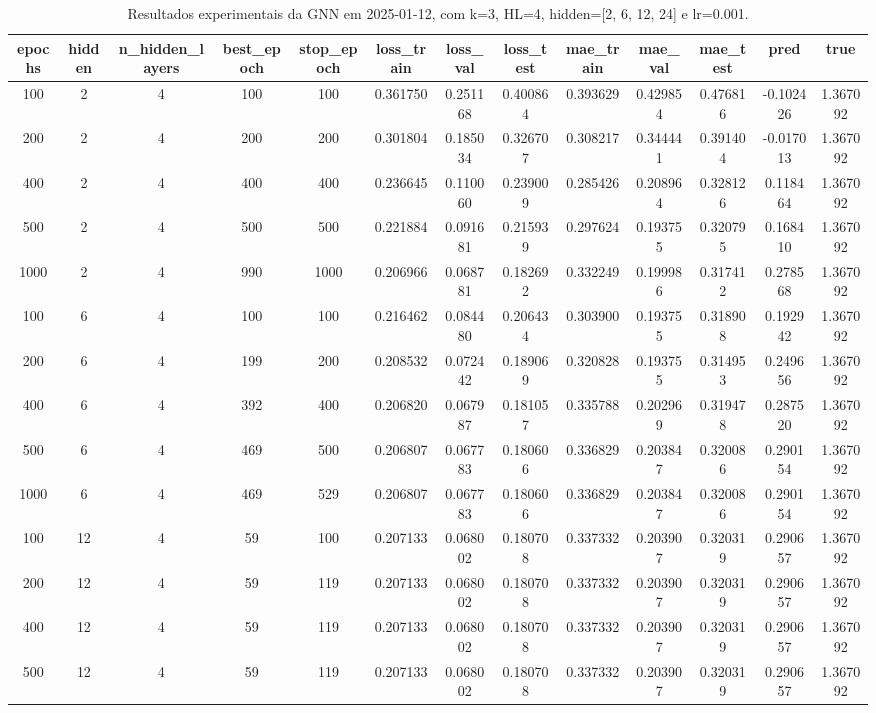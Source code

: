 \begin{table}[h]
\centering
\caption{Resultados experimentais da GNN em 2025-01-12, com k=3, HL=4, hidden=[2, 6, 12, 24] e lr=0.001.}
\label{tab:gnn_results_k3_hl4_d20250112}
\begin{tabular}{ccccccccccccc}
\toprule
epochs & hidden & n\_hidden\_layers & best\_epoch & stop\_epoch & loss\_train & loss\_val & loss\_test & mae\_train & mae\_val & mae\_test & pred & true \\
\midrule
100 & 2 & 4 & 100 & 100 & 0.361750 & 0.251168 & 0.400864 & 0.393629 & 0.429854 & 0.476816 & -0.102426 & 1.367092 \\
200 & 2 & 4 & 200 & 200 & 0.301804 & 0.185034 & 0.326707 & 0.308217 & 0.344441 & 0.391404 & -0.017013 & 1.367092 \\
400 & 2 & 4 & 400 & 400 & 0.236645 & 0.110060 & 0.239009 & 0.285426 & 0.208964 & 0.328126 & 0.118464 & 1.367092 \\
500 & 2 & 4 & 500 & 500 & 0.221884 & 0.091681 & 0.215939 & 0.297624 & 0.193755 & 0.320795 & 0.168410 & 1.367092 \\
1000 & 2 & 4 & 990 & 1000 & 0.206966 & 0.068781 & 0.182692 & 0.332249 & 0.199986 & 0.317412 & 0.278568 & 1.367092 \\
100 & 6 & 4 & 100 & 100 & 0.216462 & 0.084480 & 0.206434 & 0.303900 & 0.193755 & 0.318908 & 0.192942 & 1.367092 \\
200 & 6 & 4 & 199 & 200 & 0.208532 & 0.072442 & 0.189069 & 0.320828 & 0.193755 & 0.314953 & 0.249656 & 1.367092 \\
400 & 6 & 4 & 392 & 400 & 0.206820 & 0.067987 & 0.181057 & 0.335788 & 0.202969 & 0.319478 & 0.287520 & 1.367092 \\
500 & 6 & 4 & 469 & 500 & 0.206807 & 0.067783 & 0.180606 & 0.336829 & 0.203847 & 0.320086 & 0.290154 & 1.367092 \\
1000 & 6 & 4 & 469 & 529 & 0.206807 & 0.067783 & 0.180606 & 0.336829 & 0.203847 & 0.320086 & 0.290154 & 1.367092 \\
100 & 12 & 4 & 59 & 100 & 0.207133 & 0.068002 & 0.180708 & 0.337332 & 0.203907 & 0.320319 & 0.290657 & 1.367092 \\
200 & 12 & 4 & 59 & 119 & 0.207133 & 0.068002 & 0.180708 & 0.337332 & 0.203907 & 0.320319 & 0.290657 & 1.367092 \\
400 & 12 & 4 & 59 & 119 & 0.207133 & 0.068002 & 0.180708 & 0.337332 & 0.203907 & 0.320319 & 0.290657 & 1.367092 \\
500 & 12 & 4 & 59 & 119 & 0.207133 & 0.068002 & 0.180708 & 0.337332 & 0.203907 & 0.320319 & 0.290657 & 1.367092 \\

\end{tabular}
\end{table}
